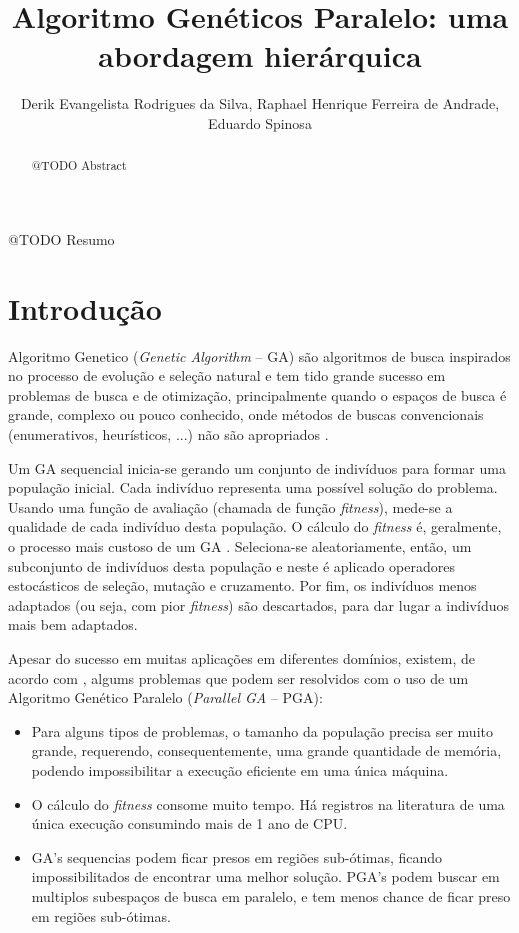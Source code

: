 \documentclass[12pt]{article}
\title{Algoritmo Genéticos Paralelo: uma abordagem hierárquica}
\author{Derik Evangelista Rodrigues da Silva\inst{1}, Raphael Henrique Ferreira de Andrade\inst{1}, \\Eduardo Spinosa\inst{1}}
\begin{document}
 

\maketitle

\begin{abstract}
  @TODO Abstract
\end{abstract}
     
\begin{resumo} 
  @TODO Resumo
\end{resumo}


\section{Introdução}


Algoritmo Genetico (\emph{Genetic Algorithm} -- GA) são algoritmos de busca inspirados no processo de evolução e seleção natural \cite{goldberg1989} e tem tido grande sucesso em problemas de busca e de otimização, principalmente quando o espaços de busca é grande, complexo ou pouco conhecido, onde métodos de buscas convencionais (enumerativos, heurísticos, ...) não são apropriados \cite{herrera1998}. 

Um GA sequencial inicia-se gerando um conjunto de indivíduos para formar uma população inicial. Cada indivíduo representa uma possível solução do problema. Usando uma função de avaliação (chamada de função \emph{fitness}), mede-se a qualidade de cada indivíduo desta população. O cálculo do \emph{fitness} é, geralmente, o processo mais custoso de um GA \cite{paraleltax}. Seleciona-se aleatoriamente, então, um subconjunto de indivíduos desta população e neste é aplicado operadores estocásticos de seleção, mutação e cruzamento. Por fim, os indivíduos menos adaptados (ou seja, com pior \emph{fitness}) são descartados, para dar lugar a indivíduos mais bem adaptados.

Apesar do sucesso em muitas aplicações em diferentes domínios, existem, de acordo com \cite{paraleltax}, algums problemas que podem ser resolvidos com o uso de um Algoritmo Genético Paralelo (\emph{Parallel GA} -- PGA):

\begin{itemize}
  \item Para alguns tipos de problemas, o tamanho da população precisa ser muito grande, requerendo, consequentemente, uma grande quantidade de memória, podendo impossibilitar a execução eficiente em uma única máquina.
  \item O cálculo do \emph{fitness} consome muito tempo. Há registros na literatura de uma única execução consumindo mais de 1 ano de CPU.
  \item GA's sequencias podem ficar presos em regiões sub-ótimas, ficando impossibilitados de encontrar uma melhor solução. PGA's podem buscar em multiplos subespaços de busca em paralelo, e tem menos chance de ficar preso em regiões sub-ótimas.
\end{itemize}
\end{document}
